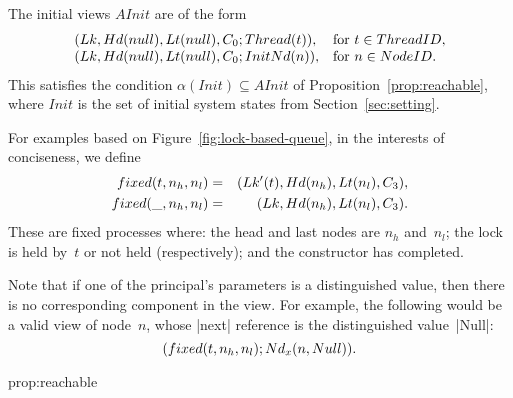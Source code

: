 The initial views $AInit$ are of the form
\[
\begin{array}{ll}
(Lk, Hd(null), Lt(null), C_0; Thread(t)), &
   \mbox{for $t \in ThreadID$}, \\
(Lk, Hd(null), Lt(null), C_0; InitNd(n)), & 
   \mbox{for $n \in NodeID$}.
\end{array}
\]
This satisfies the condition $\alpha(Init) \subseteq AInit$ of
Proposition~\ref{prop:reachable}, where $Init$ is the set of initial system
states from Section~\ref{sec:setting}.

For examples based on Figure~\ref{fig:lock-based-queue}, in the interests of
conciseness, we define
\begin{eqnarray*}
fixed(t, n_h, n_l) & = & (Lk'(t), Hd(n_h), Lt(n_l), C_3), \\
fixed(\_, n_h, n_l) & = & (Lk, Hd(n_h), Lt(n_l), C_3).
\end{eqnarray*}
%
These are fixed processes where: the head and last nodes are $n_h$ and~$n_l$;
the lock is held by~$t$ or not held (respectively); and the constructor has
completed.

Note that if one of the principal's parameters is a distinguished value, then
there is no corresponding component in the view.  For example, the following
would be a valid view of node~$n$, whose |next| reference is the distinguished
value~|Null|: 
\[
(fixed(t, n_h, n_l);  Nd_x(n, Null)).
\]





{prop:reachable}

